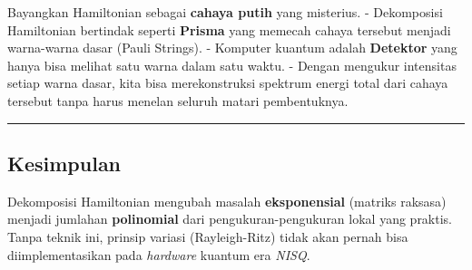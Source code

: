 Bayangkan Hamiltonian sebagai \textbf{cahaya putih} yang misterius. - Dekomposisi Hamiltonian bertindak seperti \textbf{Prisma} yang memecah cahaya tersebut menjadi warna-warna dasar (Pauli Strings). - Komputer kuantum adalah \textbf{Detektor} yang hanya bisa melihat satu warna dalam satu waktu. - Dengan mengukur intensitas setiap warna dasar, kita bisa merekonstruksi spektrum energi total dari cahaya tersebut tanpa harus menelan seluruh matari pembentuknya.

\begin{center}\rule{0.5\linewidth}{0.5pt}\end{center}

\hypertarget{kesimpulan}{%
\subsection{Kesimpulan}\label{kesimpulan-e}}

Dekomposisi Hamiltonian mengubah masalah \textbf{eksponensial} (matriks raksasa) menjadi jumlahan \textbf{polinomial} dari pengukuran-pengukuran lokal yang praktis. Tanpa teknik ini, prinsip variasi (Rayleigh-Ritz) tidak akan pernah bisa diimplementasikan pada \emph{hardware} kuantum era \emph{NISQ}.
